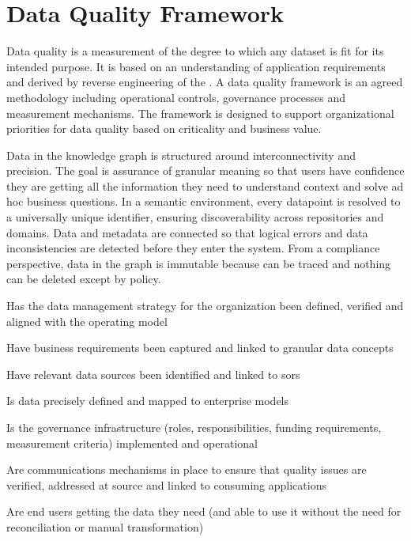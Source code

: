 \section{Data Quality Framework}\label{sec:ekgmm-b-3-1} %

Data quality is a measurement of the degree to which any dataset is fit for its intended purpose.
It is based on an understanding of application requirements and derived by reverse engineering of the
.
A data quality framework is an agreed methodology including operational controls, governance processes and
measurement mechanisms.
The framework is designed to support organizational priorities for data quality based on criticality and business value.

\kgmmekgrationalesection

Data in the knowledge graph is structured around interconnectivity and precision.
The goal is assurance of granular meaning so that users have confidence they are getting all the information they
need to understand context and solve ad hoc business questions.
In a semantic environment, every datapoint is resolved to a universally unique identifier, ensuring discoverability
across repositories and domains.
Data and metadata are connected so that logical errors and data inconsistencies are detected before they enter
the system.
From a compliance perspective, data in the graph is immutable because  can be traced and
nothing can be deleted except by policy.

\kgmmcorequestionssection

\begin{core-questions}

  \item [\thesection.1] Has the data management strategy for the organization been defined, verified and aligned
                        with the operating model
  \item [\thesection.2] Have business requirements been captured and linked to granular data concepts
  \item [\thesection.3] Have relevant data sources been identified and linked to \glspl{sor}
  \item [\thesection.4] Is data precisely defined and mapped to enterprise models
  \item [\thesection.5] Is the governance infrastructure (roles, responsibilities, funding requirements,
                        measurement criteria) imple\-mented and operational
  \item [\thesection.6] Are communications mechanisms in place to ensure that quality issues are verified,
                        addressed at source and linked to consuming applications
  \item [\thesection.7] Are end users getting the data they need (and able to use it without the need for
                        reconciliation or manual transformation)

\end{core-questions}

